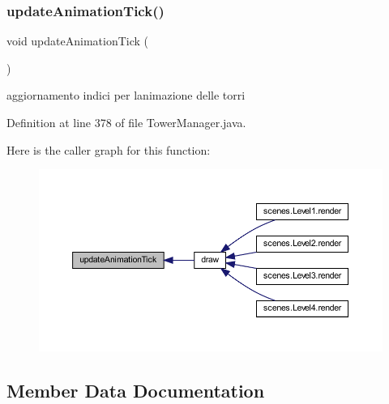 \mbox{\label{classmanagers_1_1_tower_manager_a5c2bac0f4b9a3ef4e30f60d4b0c3b951}} 
\subsubsection{\texorpdfstring{update\+Animation\+Tick()}{updateAnimationTick()}}
{\footnotesize\ttfamily void update\+Animation\+Tick (\begin{DoxyParamCaption}{ }\end{DoxyParamCaption})\hspace{0.3cm}{\ttfamily [private]}}



aggiornamento indici per l\textquotesingle{}animazione delle torri 



Definition at line 378 of file Tower\+Manager.\+java.

Here is the caller graph for this function\+:\nopagebreak
\begin{figure}[H]
\begin{center}
\leavevmode
\includegraphics[width=350pt]{classmanagers_1_1_tower_manager_a5c2bac0f4b9a3ef4e30f60d4b0c3b951_icgraph}
\end{center}
\end{figure}


\subsection{Member Data Documentation}
\mbox{\label{classmanagers_1_1_tower_manager_a04d62de5f8367e549268b6c5540e1e97}} 
